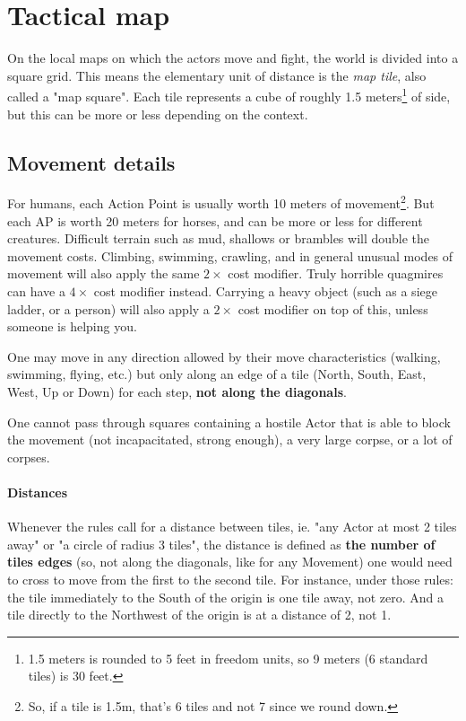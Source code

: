 \section{Tactical map}

\label{tactical_map}

On the local maps on which the actors move and fight, the world is divided into a square grid. This means the elementary unit of distance is the \textit{map tile}, also called a "map square". Each tile represents a cube of roughly 1.5 meters\footnote{1.5 meters is rounded to 5 feet in freedom units, so 9 meters (6 standard tiles) is 30 feet.} of side, but this can be more or less depending on the context.


\subsection{Movement details}

For humans, each Action Point is usually worth 10 meters of movement\footnote{So, if a tile is 1.5m, that's 6 tiles and not 7 since we round down.}. But each AP is worth 20 meters for horses, and can be more or less for different creatures. Difficult terrain such as mud, shallows or brambles will double the movement costs. Climbing, swimming, crawling, and in general unusual modes of movement will also apply the same $2\times$ cost modifier. Truly horrible quagmires can have a $4\times$ cost modifier instead. Carrying a heavy object (such as a siege ladder, or a person) will also apply a $2\times$ cost modifier on top of this, unless someone is helping you. 

One may move in any direction allowed by their move characteristics (walking, swimming, flying, etc.) but only along an edge of a tile (North, South, East, West, Up or Down) for each step, \textbf{not along the diagonals}.

One cannot pass through squares containing a hostile Actor that is able to block the movement (not incapacitated, strong enough), a very large corpse, or a lot of corpses. 


\paragraph{Distances}

Whenever the rules call for a distance between tiles, ie. "any Actor at most 2 tiles away" or "a circle of radius 3 tiles", the distance is defined as \textbf{the number of tiles edges} (so, not along the diagonals, like for any Movement) one would need to cross to move from the first to the second tile. For instance, under those rules: the tile immediately to the South of the origin is one tile away, not zero. And a tile directly to the Northwest of the origin is at a distance of 2, not 1.

